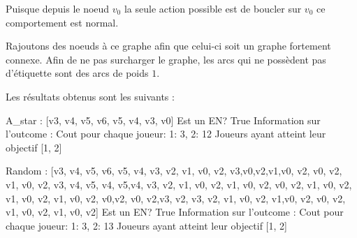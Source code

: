 Puisque depuis le noeud $v_0$ la seule action possible est de boucler sur $v_0$ ce comportement est normal. 

Rajoutons des noeuds à ce graphe afin que celui-ci soit un graphe fortement connexe. Afin de ne pas surcharger le graphe, les arcs qui ne possèdent pas d'étiquette sont des arcs de poids $1$.

\begin{figure}[ht!]
	\centering

\end{figure}
\FloatBarrier

Les résultats obtenus sont les suivants  :

\begin{code}

A_star : [v3, v4, v5, v6, v5, v4, v3, v0]
Est un EN?  True
Information sur l'outcome : 
Cout pour chaque joueur:  {1: 3, 2: 12}
Joueurs ayant atteint leur objectif  [1, 2]

Random :  [v3, v4, v5, v6, v5, v4, v3, v2, v1, v0,
v2, v3,v0,v2,v1,v0, v2, v0, v2, v1, v0, v2, v3, v4,
v5, v4, v5,v4, v3, v2, v1, v0, v2, v1, v0, v2, v0,
v2, v1, v0, v2, v1, v0, v2, v1, v0, v2, v0,v2, v0,
v2,v3, v2, v3, v2, v1, v0, v2, v1,v0, v2, v0, v2,
v1, v0, v2, v1, v0, v2]
Est un EN?  True
Information sur l'outcome :
Cout pour chaque joueur:  {1: 3, 2: 13}
Joueurs ayant atteint leur objectif  [1, 2]

\end{code}

